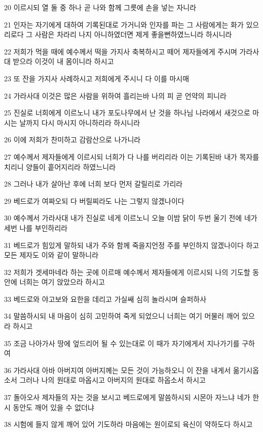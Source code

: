 \par 20 이르시되 열 둘 중 하나 곧 나와 함께 그릇에 손을 넣는 자니라
\par 21 인자는 자기에게 대하여 기록된대로 가거니와 인자를 파는 그 사람에게는 화가 있으리로다 그 사람은 차라리 나지 아니하였더면 제게 좋을뻔하였느니라 하시니라
\par 22 저희가 먹을 때에 예수께서 떡을 가지사 축복하시고 떼어 제자들에게 주시며 가라사대 받으라 이것이 내 몸이니라 하시고
\par 23 또 잔을 가지사 사례하시고 저희에게 주시니 다 이를 마시매
\par 24 가라사대 이것은 많은 사람을 위하여 흘리는바 나의 피 곧 언약의 피니라
\par 25 진실로 너희에게 이르노니 내가 포도나무에서 난 것을 하나님 나라에서 새것으로 마시는 날까지 다시 마시지 아니하리라 하시니라
\par 26 이에 저희가 찬미하고 감람산으로 나가니라
\par 27 예수께서 제자들에게 이르시되 너희가 다 나를 버리리라 이는 기록된바 내가 목자를 치리니 양들이 흩어지리라 하였느니라
\par 28 그러나 내가 살아난 후에 너희 보다 먼저 갈릴리로 가리라
\par 29 베드로가 여짜오되 다 버릴찌라도 나는 그렇지 않겠나이다
\par 30 예수께서 가라사대 내가 진실로 네게 이르노니 오늘 이밤 닭이 두번 울기 전에 네가 세번 나를 부인하리라
\par 31 베드로가 힘있게 말하되 내가 주와 함께 죽을지언정 주를 부인하지 않겠나이다 하고 모든 제자도 이와 같이 말하니라
\par 32 저희가 겟세마네라 하는 곳에 이르매 예수께서 제자들에게 이르시되 나의 기도할 동안에 너희는 여기 앉았으라 하시고
\par 33 베드로와 야고보와 요한을 데리고 가실쌔 심히 놀라시며 슬퍼하사
\par 34 말씀하시되 내 마음이 심히 고민하여 죽게 되었으니 너희는 여기 머물러 깨어 있으라 하시고
\par 35 조금 나아가사 땅에 엎드리어 될 수 있는대로 이 때가 자기에게서 지나가기를 구하여
\par 36 가라사대 아바 아버지여 아버지께는 모든 것이 가능하오니 이 잔을 내게서 옮기시옵소서 그러나 나의 원대로 마옵시고 아버지의 원대로 하옵소서 하시고
\par 37 돌아오사 제자들의 자는 것을 보시고 베드로에게 말씀하시되 시몬아 자느냐 네가 한시 동안도 깨어 있을 수 없더냐
\par 38 시험에 들지 않게 깨어 있어 기도하라 마음에는 원이로되 육신이 약하도다 하시고
